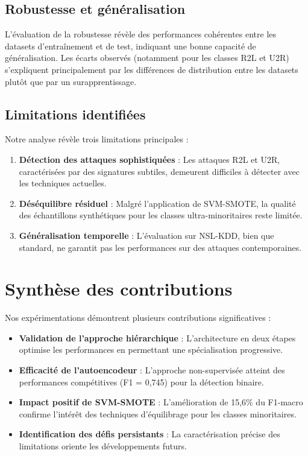 \subsection{Robustesse et généralisation}

L'évaluation de la robustesse révèle des performances cohérentes entre les datasets d'entraînement et de test, indiquant une bonne capacité de généralisation. Les écarts observés (notamment pour les classes R2L et U2R) s'expliquent principalement par les différences de distribution entre les datasets plutôt que par un surapprentissage.

\subsection{Limitations identifiées}

Notre analyse révèle trois limitations principales :

\begin{enumerate}
    \item \textbf{Détection des attaques sophistiquées} : Les attaques R2L et U2R, caractérisées par des signatures subtiles, demeurent difficiles à détecter avec les techniques actuelles.
    
    \item \textbf{Déséquilibre résiduel} : Malgré l'application de SVM-SMOTE, la qualité des échantillons synthétiques pour les classes ultra-minoritaires reste limitée.
    
    \item \textbf{Généralisation temporelle} : L'évaluation sur NSL-KDD, bien que standard, ne garantit pas les performances sur des attaques contemporaines.
\end{enumerate}

\section{Synthèse des contributions}

Nos expérimentations démontrent plusieurs contributions significatives :

\begin{itemize}
    \item \textbf{Validation de l'approche hiérarchique} : L'architecture en deux étapes optimise les performances en permettant une spécialisation progressive.
    
    \item \textbf{Efficacité de l'autoencodeur} : L'approche non-supervisée atteint des performances compétitives (F1 = 0,745) pour la détection binaire.
    
    \item \textbf{Impact positif de SVM-SMOTE} : L'amélioration de 15,6\% du F1-macro confirme l'intérêt des techniques d'équilibrage pour les classes minoritaires.
    
    \item \textbf{Identification des défis persistants} : La caractérisation précise des limitations oriente les développements futurs.
\end{itemize}

